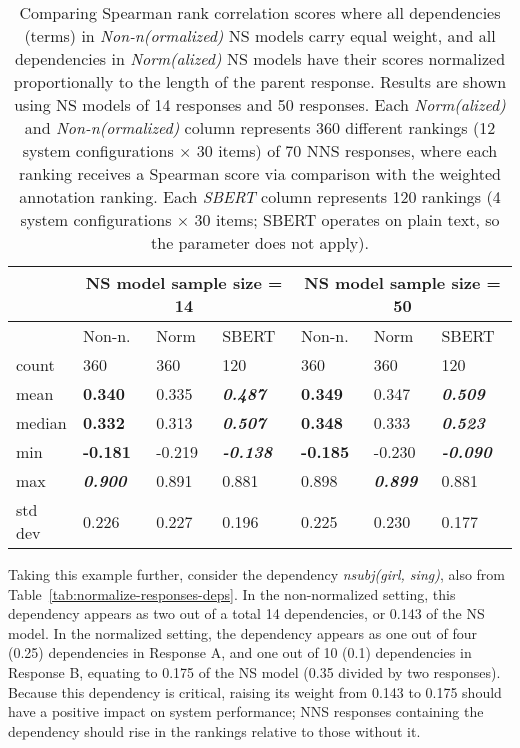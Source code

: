 \begin{table}[htb!]
\begin{center}
\begin{tabular}{|l||l|l|l||l|l|l|}
\hline
 & \multicolumn{3}{c||}{NS model sample size = 14} & \multicolumn{3}{c|}{NS model sample size = 50} \\
\hline
		& Non-n. 		& Norm 			& SBERT 								& Non-n. 			& Norm 				& SBERT 		\\
\hline
\hline
count 	& 360 			& 360 			& 120 								& 360 				& 360 				& 120		 \\
\hline
mean 	& \textbf{0.340} & 0.335 & \textit{\textbf{0.487}}					& \textbf{0.349} 	& 0.347 		& \textit{\textbf{0.509}}		 \\
\hline
median 	& \textbf{0.332} & 0.313 & \textit{\textbf{0.507}} 					& \textbf{0.348} 	& 0.333 		& \textit{\textbf{0.523}}		 \\
\hline
min 	& \textbf{-0.181} 	& -0.219 & \textit{\textbf{-0.138}} 			& \textbf{-0.185} 	& -0.230 		& \textit{\textbf{-0.090}}		 \\
\hline
max	& \textit{\textbf{0.900}} & 0.891 	& 0.881 							& 0.898 	& \textit{\textbf{0.899}} 	& 0.881		 \\
\hline
std dev & 0.226 		& 0.227 		& 0.196 							& 0.225 		& 0.230 				& 0.177		 \\
\hline
\end{tabular}
\caption{\label{tab:term-norm-results} Comparing Spearman rank correlation scores where all dependencies (terms) in \textit{Non-n(ormalized)} NS models carry equal weight, and all dependencies in \textit{Norm(alized)} NS models have their scores normalized proportionally to the length of the parent response. Results are shown using NS models of 14 responses and 50 responses. Each \textit{Norm(alized)} and \textit{Non-n(ormalized)} column represents 360 different rankings (12 system configurations $\times$ 30 items) of 70 NNS responses, where each ranking receives a Spearman score via comparison with the weighted annotation ranking. Each \textit{SBERT} column represents 120 rankings (4 system configurations $\times$ 30 items; SBERT operates on plain text, so the  parameter does not apply).
}
\end{center}
\end{table}


Taking this example further, consider the dependency \textit{nsubj(girl, sing)}, also from Table~\ref{tab:normalize-responses-deps}. In the non-normalized setting, this dependency appears as two out of a total 14 dependencies, or 0.143 of the NS model. In the normalized setting, the dependency appears as one out of four (0.25) dependencies in Response A, and one out of 10 (0.1) dependencies in Response B, equating to 0.175 of the NS model (0.35 divided by two responses). Because this dependency is critical, raising its weight from 0.143 to 0.175 should have a positive impact on system performance; NNS responses containing the dependency should rise in the rankings relative to those without it. 

